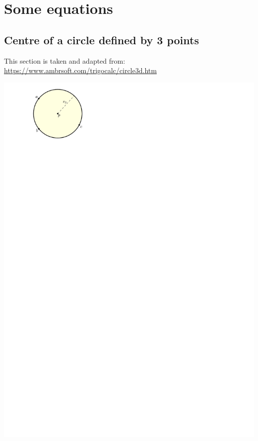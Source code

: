 
\graphicspath{{appendices/equations/figs/}}

\chapter{Some equations}%
\label{app:equations}

%
\section{Centre of a circle defined by 3 points}%
\label{sec:centrecircle}



\begin{kaobox-toread}[frametitle=\faExternalLink\ ]
  This section is taken and adapted from:
  \\
  \url{https://www.ambrsoft.com/trigocalc/circle3d.htm}
\end{kaobox-toread}


\begin{marginfigure}
  \centering
  \includegraphics[width=\linewidth]{circle.pdf}
\end{marginfigure}


